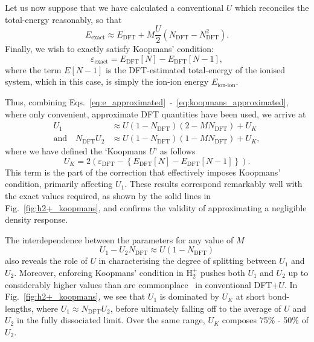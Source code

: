 Let us now suppose that we have calculated 
a conventional $U$ which 
reconciles the total-energy reasonably, 
so that
%
\begin{equation}
E_{\textrm{exact}} \approx E_{\textrm{DFT}} +  M\frac{U}{2} \left( N_{\textrm{DFT}} - N^2_{\textrm{DFT}} \right).
\label{eq:dft+u_approximated}
\end{equation}
%
 Finally, we wish to exactly satisfy Koopmans' condition:
%
\begin{equation}
\varepsilon_{\textrm{exact}} = E_\textrm{DFT} [N] - E_\textrm{DFT} [N-1],
\label{eq:koopmans_approximated}
\end{equation} 
%
where the term $E[N-1]$ is the DFT-estimated 
total-energy of the ionised system, 
which in this case, is simply 
the ion-ion energy $E_\textrm{ion-ion}$.
 
Thus, combining Eqs.~\eqref{eq:e_approximated}~-~\eqref{eq:koopmans_approximated}, 
where only convenient, approximate 
DFT quantities have been used, 
we arrive at 
%
\begin{align}
U_1 &{}\approx  U \left( 1 - N_{\textrm{DFT}} \right) 
\left( 2 - M N_{\textrm{DFT}}  \right) 
+ U_K \nonumber \\[0.5em]
\mbox{and}\quad 
N_\textrm{DFT}U_2 &{}\approx  U \left( 1 - N_{\textrm{DFT}} \right) 
\left( 1 - M N_{\textrm{DFT}}  \right) + U_K , 
\label{eq:U1U2}
\end{align}
%
where we have defined the `Koopmans  $U$' as follows 
%
\begin{equation}
U_K =  2 \left(\varepsilon_\textrm{DFT} - \left\{E_\textrm{DFT}[N] - E_\textrm{DFT}[N-1]\right\}\right).
\end{equation} 
%
This term is the part of the correction that 
effectively imposes Koopmans' condition, 
primarily affecting $U_1$.
%
These results correspond remarkably 
well with the exact values required, 
as shown by the solid lines in Fig.~\ref{fig:h2+_koopmans}, 
and confirms the validity of approximating  
a negligible density response.

The interdependence between the parameters 
for any value of $M$ 
%
\begin{equation}
U_1 - U_2 N_\textrm{DFT} \approx U \left( 1 - N_\textrm{DFT} \right)
\end{equation}
%
also reveals the role
of $U$ in characterising the degree of 
splitting between $U_1$ and $U_2$.
Moreover, 
enforcing Koopmans' condition in H$_2^+$ 
pushes both $U_1$ and $U_2$ 
up to considerably higher values
than are commonplace~\cite{QUA:QUA24521} 
in conventional DFT+$U$.
%
In Fig.~\ref{fig:h2+_koopmans}, 
we see that 
$U_1$ is dominated by $U_K$ at short bond-lengths, 
where $U_1 \approx N_\textrm{DFT} U_2$, 
before ultimately falling off to 
the average of $U$ and $U_2$ in
the fully dissociated limit.
%
Over the same range, 
$U_K$ composes 75\% - 50\% of $U_2$.






